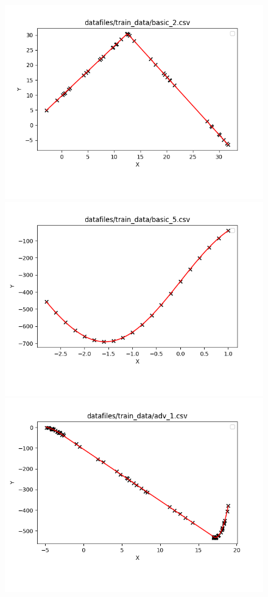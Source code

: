 \documentclass{article}
\begin{document}
\begin{figure}[!hbt]
  \includegraphics[scale=0.34]{./images/basic_2}
  \includegraphics[scale=0.34]{./images/basic_5}
  \includegraphics[scale=0.34]{./images/adv_1}

\end{figure}
\end{document}
